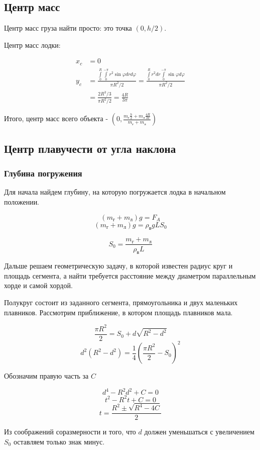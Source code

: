 \documentclass[a4paper]{article}
\begin{document}
\subsection{Центр масс}

Центр масс груза найти просто: это точка $(0, h/2)$.

Центр масс лодки:

\begin{align*}
	x_c & = 0 \\
	y_c & = \frac{\int\limits_0^R \int\limits_0^{-\pi} r^2 \sin \varphi dr d\varphi}{\pi R^2/2} 
		= \frac{\int\limits_0^R r^2 dr \int\limits_0^{-\pi}  \sin \varphi d\varphi}{\pi R^2/2} \\
		& = \frac{2R^3/3}{\pi R^2/2} = \frac{4R}{3\pi} 
\end{align*}

Итого, центр масс всего объекта - $(0, \frac{m_\text{г}\frac{h}{2} + m_\text{л}\frac{4R}{3\pi}}{m_\text{г} + m_\text{л}})$

\subsection{Центр плавучести от угла наклона}

\subsubsection{Глубина погружения}
Для начала найдем глубину, на которую погружается лодка в начальном положении.

$$ (m_\text{г} + m_\text{л})g = F_A $$
$$ (m_\text{г} + m_\text{л})g = \rho_\text{в}gLS_0 $$

$$ S_0 = \frac{m_\text{г} + m_\text{л}}{\rho_\text{в}L} $$

Дальше решаем геометрическую задачу, в которой известен радиус круг и площадь сегмента, а найти требуется расстояние между диаметром параллельным хорде и самой хордой.

Полукруг состоит из заданного сегмента, прямоугольника и двух маленьких плавников. Рассмотрим приближение, в котором площадь плавников мала.

$$ \frac{\pi R^2}{2} = S_0 + d\sqrt{R^2-d^2} $$
$$ d^2(R^2-d^2) = \frac{1}{4}(\frac{\pi R^2}{2} - S_0)^2 $$

Обозначим правую часть за $C$

$$ d^4 - R^2d^2 + C = 0 $$
$$ t^2 - R^2t + C = 0 $$
$$ t = \frac{R^2 \pm \sqrt{R^4-4C}}{2} $$

Из соображений соразмерности и того, что $d$ должен уменьшаться с увеличением $S_0$ оставляем только знак минус.
\end{document}
